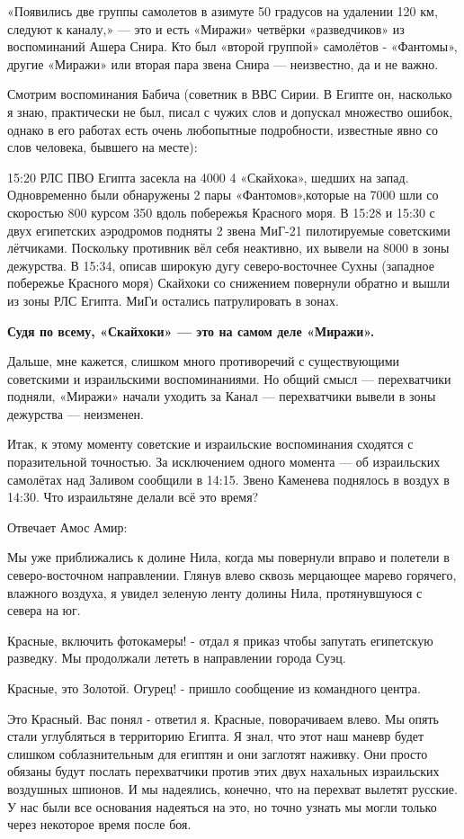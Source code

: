 «Появились две группы самолетов в азимуте 50 градусов на удалении 120 км, следуют к каналу,» — это и есть «Миражи» четвёрки «разведчиков» из воспоминаний Ашера Снира. Кто был «второй группой» самолётов - «Фантомы», другие «Миражи» или вторая пара звена Снира — неизвестно, да и не важно.

Смотрим воспоминания Бабича (советник в ВВС Сирии. В Египте он, насколько я знаю, практически не был, писал с чужих слов и допускал множество ошибок, однако в его работах есть очень любопытные подробности, известные явно со слов человека, бывшего на месте):

\begin{textcitation}
	15:20 РЛС ПВО Египта засекла на 4000 4 «Скайхока», шедших на запад. Одновременно были обнаружены 2 пары «Фантомов»,которые на 7000 шли со скоростью 800 курсом 350 вдоль побережья Красного моря. В 15:28 и 15:30 с двух египетских аэродромов подняты 2 звена МиГ-21 пилотируемые советскими лётчиками. Поскольку противник вёл себя неактивно, их вывели на 8000 в зоны дежурства. В 15:34, описав широкую дугу северо-восточнее Сухны (западное побережье Красного моря) Скайхоки со снижением повернули обратно и вышли из зоны РЛС Египта. МиГи остались патрулировать в зонах.
\end{textcitation}

\textbf{Судя по всему, «Скайхоки» — это на самом деле «Миражи». }

Дальше, мне кажется, слишком много противоречий с существующими советскими и израильскими воспоминаниями. Но общий смысл — перехватчики подняли, «Миражи» начали уходить за Канал — перехватчики вывели в зоны дежурства — неизменен.

Итак, к этому моменту советские и израильские воспоминания сходятся с поразительной точностью. За исключением одного момента — об израильских самолётах над Заливом сообщили в 14:15. Звено Каменева поднялось в воздух в 14:30. Что израильтяне делали всё это время?

Отвечает Амос Амир:

\begin{textcitation}
	Мы уже приближались к долине Нила, когда мы повернули вправо и полетели в северо-восточном направлении. Глянув влево сквозь мерцающее марево горячего, влажного воздуха, я увидел зеленую ленту долины Нила, протянувшуюся с севера на юг.
	
	Красные, включить фотокамеры! - отдал я приказ чтобы запутать египетскую разведку. Мы продолжали лететь в направлении города Суэц.
	
	Красные, это Золотой. Огурец! - пришло сообщение из командного центра.
	
	Это Красный. Вас понял - ответил я. Красные, поворачиваем влево. Мы опять стали углубляться в территорию Египта. Я знал, что этот наш маневр будет слишком соблазнительным для египтян и они заглотят наживку. Они просто обязаны будут послать перехватчики против этих двух нахальных израильских воздушных шпионов. И мы надеялись, конечно, что на перехват вылетят русские. У нас были все основания надеяться на это, но точно узнать мы могли только через некоторое время после боя.
\end{textcitation}


